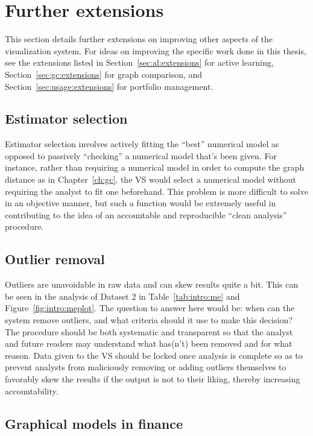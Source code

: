 \section{Further extensions}
\label{sec:futurework}

This section details further extensions on improving other aspects of the 
visualization system. For ideas on improving the specific work done in this 
thesis, see the extensions listed in Section~\ref{sec:al:extensions} for active 
learning, Section~\ref{sec:gc:extensions} for graph comparison, and 
Section~\ref{sec:usage:extensions} for portfolio management.

\subsection{Estimator selection}
\label{sec:futurework:estimatorselection}

Estimator selection involves actively fitting the ``best'' numerical model as 
opposed to passively
``checking'' a numerical model that's been given. For instance, rather than 
requiring a numerical model in order to compute the graph distance as in 
Chapter~\ref{ch:gc}, the VS would select a numerical model without requiring 
the analyst to fit one beforehand. This problem is more difficult
to solve in an objective manner, but such a function would be extremely useful 
in contributing to the idea of an accountable and reproducible ``clean 
analysis'' procedure.

\subsection{Outlier removal}
\label{sec:futurework:outlier}

Outliers are unavoidable in raw data and can skew results quite a bit. This can 
be seen in the analysis of Dataset 2 in Table~\ref{tab:intro:me} and 
Figure~\ref{fig:intro:meplot}. The question to answer here would be: when can 
the system remove outliers, and what criteria should it use to make this 
decision? The procedure should be both systematic and transparent so that the 
analyst and future readers may understand what has(n't) been removed and for 
what reason. Data given to the VS should be locked once analysis is complete so 
as to prevent analysts from maliciously removing or adding outliers themselves 
to favorably skew the results if the output is not to their liking, thereby 
increasing accountability. 

\subsection{Graphical models in finance}
\label{sec:futurework:graphicalmodel}


